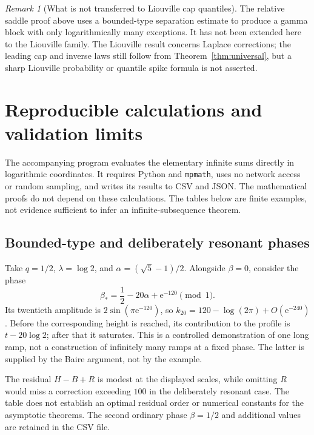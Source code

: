 \documentclass[11pt,a4paper]{article}
\theoremstyle{definition}
\theoremstyle{remark}\newtheorem{remark}[theorem]{Remark}
\newcommand{\e}{\mathrm e}
\begin{document}
\begin{remark}[What is not transferred to Liouville cap quantiles]
The relative saddle proof above uses a bounded-type separation estimate to
produce a gamma block with only logarithmically many exceptions.  It has not
been extended here to the Liouville family.  The Liouville result concerns
Laplace corrections; the leading cap and inverse laws still follow from
Theorem~\ref{thm:universal}, but a sharp Liouville probability or quantile
spike formula is not asserted.
\end{remark}

\section{Reproducible calculations and validation limits}
\label{sec:computations}

The accompanying program  evaluates the elementary
infinite sums directly in logarithmic coordinates.  It requires Python and
\texttt{mpmath}, uses no network access or random sampling, and writes its
results to CSV and JSON.  The mathematical proofs do not depend on these
calculations.  The tables below are finite examples, not evidence sufficient
to infer an infinite-subsequence theorem.

\subsection{Bounded-type and deliberately resonant phases}

Take $q=1/2$, $\lambda=\log2$, and
$\alpha=(\sqrt5-1)/2$.  Alongside $\beta=0$, consider the phase
\begin{equation}
 \beta_* =\frac12-20\alpha+\e^{-120}\pmod1.
 \label{eq:engineeredphase}
\end{equation}
Its twentieth amplitude is
$2\sin(\pi\e^{-120})$, so
$k_{20}=120-\log(2\pi)+O(\e^{-240})$.
Before the corresponding height is reached, its contribution to the profile
is $t-20\log2$; after that it saturates.  This is a controlled demonstration
of one long ramp, not a construction of infinitely many ramps at a fixed
phase.  The latter is supplied by the Baire argument, not by the example.

\begin{center}\small

\end{center}

The residual $H-B+R$ is modest at the displayed scales, while omitting $R$
would miss a correction exceeding $100$ in the deliberately resonant case.
The table does not establish an optimal residual order or numerical constants
for the asymptotic theorems.  The second ordinary phase $\beta=1/2$ and
additional values are retained in the CSV file.
\end{document}
